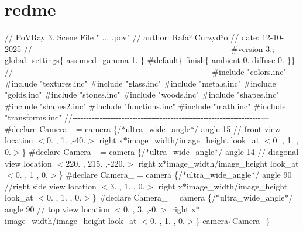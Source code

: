 \chapter{redme }
\hypertarget{md__c_1_2_users_2_sebastian_2_desktop_2_lista_dwukierunkowa_2redme}{}\label{md__c_1_2_users_2_sebastian_2_desktop_2_lista_dwukierunkowa_2redme}
// Po\+VRay 3. Scene File "{} ... .\+pov"{} // author\+: Rafa³ Curzyd³o // date\+: 12-\/10-\/2025 //-\/-\/-\/-\/-\/-\/-\/-\/-\/-\/-\/-\/-\/-\/-\/-\/-\/-\/-\/-\/-\/-\/-\/-\/-\/-\/-\/-\/-\/-\/-\/-\/-\/-\/-\/-\/-\/-\/-\/-\/-\/-\/-\/-\/-\/-\/-\/-\/-\/-\/-\/-\/-\/-\/-\/-\/-\/-\/-\/-\/-\/-\/-\/-\/-\/-\/-\/-\/-\/--- \#version 3.; global\+\_\+settings\{ assumed\+\_\+gamma 1. \} \#default\{ finish\{ ambient 0. diffuse 0. \}\} //-\/-\/-\/-\/-\/-\/-\/-\/-\/-\/-\/-\/-\/-\/-\/-\/-\/-\/-\/-\/-\/-\/-\/-\/-\/-\/-\/-\/-\/-\/-\/-\/-\/-\/-\/-\/-\/-\/-\/-\/-\/-\/-\/-\/-\/-\/-\/-\/-\/-\/-\/-\/-\/-\/-\/-\/-\/-\/-\/-\/-\/-\/-\/-\/-\/-\/-\/-\/-\/--- \#include "{}colors.\+inc"{} \#include "{}textures.\+inc"{} \#include "{}glass.\+inc"{} \#include "{}metals.\+inc"{} \#include "{}golds.\+inc"{} \#include "{}stones.\+inc"{} \#include "{}woods.\+inc"{} \#include "{}shapes.\+inc"{} \#include "{}shapes2.\+inc"{} \#include "{}functions.\+inc"{} \#include "{}math.\+inc"{} \#include "{}transforms.\+inc"{} //-\/-\/-\/-\/-\/-\/-\/-\/-\/-\/-\/-\/-\/-\/-\/-\/-\/-\/-\/-\/-\/-\/-\/-\/-\/-\/-\/-\/-\/-\/-\/-\/-\/-\/-\/-\/-\/-\/-\/-\/-\/-\/-\/-\/-\/-\/-\/-\/-\/-\/-\/-\/-\/-\/-\/-\/-\/-\/-\/-\/-\/-\/-\/-\/-\/-\/-\/-\/-\/--- \#declare Camera\+\_ = camera \{/\texorpdfstring{$\ast$}{*}ultra\+\_\+wide\+\_\+angle\texorpdfstring{$\ast$}{*}/ angle 15 // front view location \texorpdfstring{$<$}{<}0. , 1. ,-\/40.\texorpdfstring{$>$}{>} right x\texorpdfstring{$\ast$}{*}image\+\_\+width/image\+\_\+height look\+\_\+at \texorpdfstring{$<$}{<}0. , 1. , 0.\texorpdfstring{$>$}{>}\} \#declare Camera\+\_ = camera \{/\texorpdfstring{$\ast$}{*}ultra\+\_\+wide\+\_\+angle\texorpdfstring{$\ast$}{*}/ angle 14 // diagonal view location \texorpdfstring{$<$}{<}220. , 215. ,-\/220.\texorpdfstring{$>$}{>} right x\texorpdfstring{$\ast$}{*}image\+\_\+width/image\+\_\+height look\+\_\+at \texorpdfstring{$<$}{<}0. , 1 , 0.\texorpdfstring{$>$}{>}\} \#declare Camera\+\_ = camera \{/\texorpdfstring{$\ast$}{*}ultra\+\_\+wide\+\_\+angle\texorpdfstring{$\ast$}{*}/ angle 90 //right side view location \texorpdfstring{$<$}{<}3. , 1. , 0.\texorpdfstring{$>$}{>} right x\texorpdfstring{$\ast$}{*}image\+\_\+width/image\+\_\+height look\+\_\+at \texorpdfstring{$<$}{<}0. , 1. , 0.\texorpdfstring{$>$}{>}\} \#declare Camera\+\_ = camera \{/\texorpdfstring{$\ast$}{*}ultra\+\_\+wide\+\_\+angle\texorpdfstring{$\ast$}{*}/ angle 90 // top view location \texorpdfstring{$<$}{<}0. , 3. ,-\/0.\texorpdfstring{$>$}{>} right x\texorpdfstring{$\ast$}{*}image\+\_\+width/image\+\_\+height look\+\_\+at \texorpdfstring{$<$}{<}0. , 1. , 0.\texorpdfstring{$>$}{>}\} camera\{Camera\+\_\} 